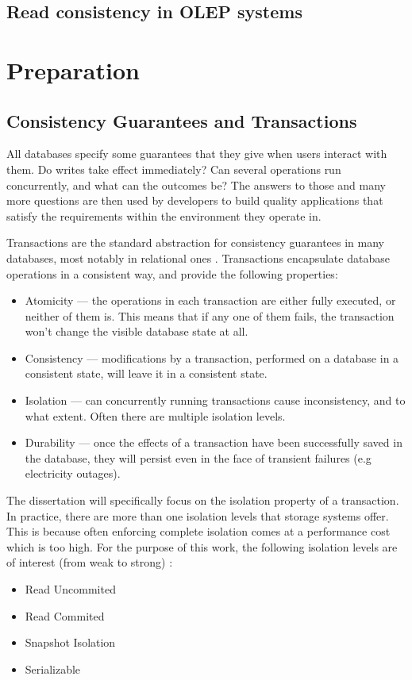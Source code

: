 \documentclass[12pt]{article}
\begin{document}
\subsection{Read consistency in OLEP systems}

\section{Preparation}

\subsection{Consistency Guarantees and Transactions}
\label{trans}

All databases specify some guarantees that they give when users interact with them. Do writes take effect immediately? Can several operations run concurrently, and what can the outcomes be? The answers to those and many more questions are then used by developers to build quality applications that satisfy the requirements within the environment they operate in.

Transactions are the standard abstraction for consistency guarantees in many databases, most notably in relational ones \cite{wikiTrans}. Transactions encapsulate database operations in a consistent way, and provide the following properties:
\begin{itemize}
    \item Atomicity --- the operations in each transaction are either fully executed, or neither of them is. This means that if any one of them fails, the transaction won't change the visible database state at all.
    \item Consistency --- modifications by a transaction, performed on a database in a consistent state, will leave it in a consistent state.
    \item Isolation --- can concurrently running transactions cause inconsistency, and to what extent. Often there are multiple isolation levels.
    \item Durability --- once the effects of a transaction have been successfully saved in the database, they will persist even in the face of transient failures (e.g electricity outages).
\end{itemize}

The dissertation will specifically focus on the isolation property of a transaction. In practice, there are more than one isolation levels that storage systems offer. This is because often enforcing complete isolation comes at a performance cost which is too high. For the purpose of this work, the following isolation levels are of interest (from weak to strong) \cite{isolation}:
\begin{itemize}
    \item Read Uncommited
    \item Read Commited
    \item Snapshot Isolation
    \item Serializable
\end{itemize}
\end{document}
